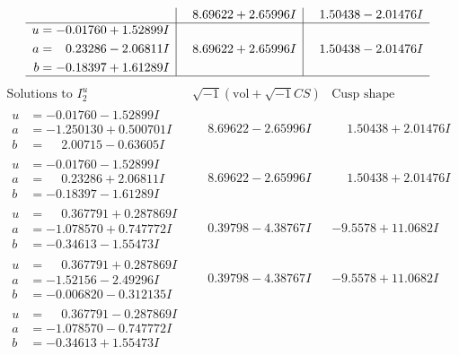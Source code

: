\documentclass[1p]{elsarticle_modified}
\theoremstyle{definition}
\newcommand{\I}{\sqrt{-1}}
\begin{document}
$$\begin{array}{c|c|c}
 & \phantom{-}8.69622 + 2.65996 I & \phantom{-}1.50438 - 2.01476 I \\ \hline\begin{aligned}
u &= -0.01760 + 1.52899 I \\
a &= \phantom{-}0.23286 - 2.06811 I \\
b &= -0.18397 + 1.61289 I\end{aligned}
 & \phantom{-}8.69622 + 2.65996 I & \phantom{-}1.50438 - 2.01476 I\\
 \hline 
 \end{array}$$\newpage$$\begin{array}{c|c|c}  
\text{Solutions to }I^u_{2}& \I (\text{vol} + \sqrt{-1}CS) & \text{Cusp shape}\\
 \hline 
\begin{aligned}
u &= -0.01760 - 1.52899 I \\
a &= -1.250130 + 0.500701 I \\
b &= \phantom{-}2.00715 - 0.63605 I\end{aligned}
 & \phantom{-}8.69622 - 2.65996 I & \phantom{-}1.50438 + 2.01476 I \\ \hline\begin{aligned}
u &= -0.01760 - 1.52899 I \\
a &= \phantom{-}0.23286 + 2.06811 I \\
b &= -0.18397 - 1.61289 I\end{aligned}
 & \phantom{-}8.69622 - 2.65996 I & \phantom{-}1.50438 + 2.01476 I \\ \hline\begin{aligned}
u &= \phantom{-}0.367791 + 0.287869 I \\
a &= -1.078570 + 0.747772 I \\
b &= -0.34613 - 1.55473 I\end{aligned}
 & \phantom{-}0.39798 - 4.38767 I & -9.5578 + 11.0682 I \\ \hline\begin{aligned}
u &= \phantom{-}0.367791 + 0.287869 I \\
a &= -1.52156 - 2.49296 I \\
b &= -0.006820 - 0.312135 I\end{aligned}
 & \phantom{-}0.39798 - 4.38767 I & -9.5578 + 11.0682 I \\ \hline\begin{aligned}
u &= \phantom{-}0.367791 - 0.287869 I \\
a &= -1.078570 - 0.747772 I \\
b &= -0.34613 + 1.55473 I\end{aligned}

\end{array}$$
\end{document}
